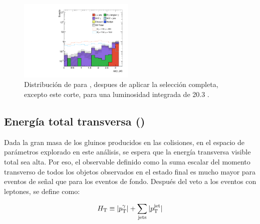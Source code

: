 %



\begin{figure}[!h]
  \centering

  \includegraphics[width=0.49\textwidth]{figures/dphi_gamjet_srh}

  \caption{Distribución de {\dphijg} para {\SRH}, despues de aplicar la selección completa, excepto este corte,
    para una luminosidad integrada de 20.3 \ifb.}
  \label{fig:opt_dphi_gamjet}
\end{figure}



\subsection{Energía total transversa (\HT)}
\label{sec:ht_obj}

Dada la gran masa de los gluinos producidos en las colisiones, en el espacio de
parámetros explorado en este análisis, se espera que la energía transversa
visible total sea alta. Por eso, el observable {\HT} definido como la suma
escalar del momento transverso de todos los objetos observados en el estado
final es mucho mayor para eventos de señal que para los eventos de fondo.
Después del veto a los eventos con leptones, {\HT} se define como:

\begin{equation}
  H_{\mathrm{T}} \equiv |p_{\mathrm{T}}^{\gamma}| + \sum_{\mathrm{jets}} |p_{\mathrm{T}}^\mathrm{jet}|
  \label{eq:ht_def}
\end{equation}

